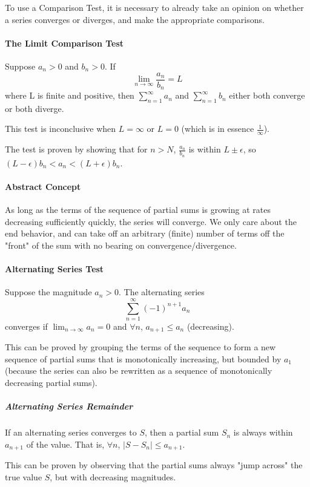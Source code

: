 \documentclass{article}
\begin{document}
To use a Comparison Test, it is necessary to already take an opinion on whether a series converges or diverges, and make the appropriate comparisons.

\paragraph{The Limit Comparison Test}
Suppose $a_n > 0$ and $b_n > 0$. If $$\lim_{n\to\infty}\frac{a_n}{b_n} = L$$ where L is finite and positive, then $\sum_{n=1}^{\infty} a_n$ and $\sum_{n=1}^{\infty} b_n$ either both converge or both diverge.

This test is inconclusive when $L = \infty$ or $L = 0$ (which is in essence $\frac{1}{\infty}$).

The test is proven by showing that for $n > N$, $\frac{a_n}{b_n}$ is within $L \pm \epsilon$, so $\left(L - \epsilon\right)b_n < a_n < \left(L + \epsilon\right)b_n$.

\paragraph{Abstract Concept} As long as the terms of the sequence of partial sums is growing at rates decreasing sufficiently quickly, the series will converge. We only care about the end behavior, and can take off an arbitrary (finite) number of terms off the "front" of the sum with no bearing on convergence/divergence.

\paragraph{Alternating Series Test}
Suppose the magnitude $a_n > 0$. The alternating series $$\sum_{n=1}^{\infty} (-1)^{n+1}a_n$$ converges if $\lim_{n \to \infty} a_n = 0$ and $\forall n$, $a_{n+1} \le a_n$ (decreasing).

This can be proved by grouping the terms of the sequence to form a new sequence of partial sums that is monotonically increasing, but bounded by $a_1$ (because the series can also be rewritten as a sequence of monotonically decreasing partial sums).

\subparagraph{Alternating Series Remainder} If an alternating series converges to $S$, then a partial sum $S_n$ is always within $a_{n+1}$ of the value. That is, $\forall n$, $|S-S_n| \le a_{n+1}$.

This can be proven by observing that the partial sums always "jump across" the true value $S$, but with decreasing magnitudes.
\end{document}
